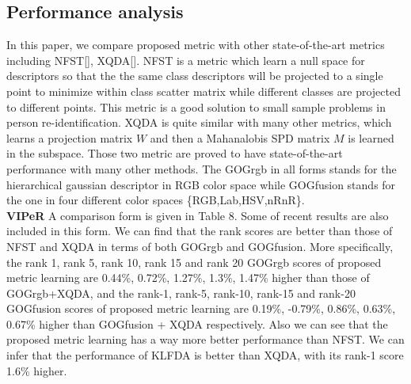 \documentclass[conference,compsoc]{IEEEtran}
\begin{document}
\subsection{Performance analysis}
In this paper, we compare proposed metric with other state-of-the-art metrics including NFST[], XQDA[]. NFST is a metric which learn a null space for descriptors so that the the same class descriptors will be projected to  
a single point to minimize within class scatter matrix while different classes are projected to different points. This metric is a good solution to small sample problems in person re-identification. XQDA is quite similar with many other metrics, which learns a projection matrix $W$ and then a Mahanalobis SPD matrix $M$ is learned in the subspace. Those two metric are proved to have state-of-the-art performance with many other methods. The GOGrgb in all forms stands for the hierarchical gaussian descriptor in RGB color space while GOGfusion stands for the one in four different color spaces \{RGB,Lab,HSV,nRnR\}.\\
\textbf{VIPeR} A comparison form is given in Table 8. Some of recent results are also included in this form. We can find that the rank scores are better than those of NFST and XQDA in terms of both GOGrgb and GOGfusion. More specifically, the rank 1, rank 5, rank 10, rank 15 and rank 20 GOGrgb scores of proposed metric learning are 0.44\%, 0.72\%, 1.27\%, 1.3\%, 1.47\% higher than those of GOGrgb+XQDA, and the rank-1, rank-5, rank-10, rank-15 and rank-20 GOGfusion scores of proposed metric learning are 0.19\%, -0.79\%, 0.86\%, 0.63\%, 0.67\% higher than GOGfusion + XQDA respectively. Also we can see that the proposed metric learning has a way more better performance than NFST. We can infer that the performance of KLFDA is better than XQDA, with its rank-1 score 1.6\% higher.  \newline 
\end{document}
